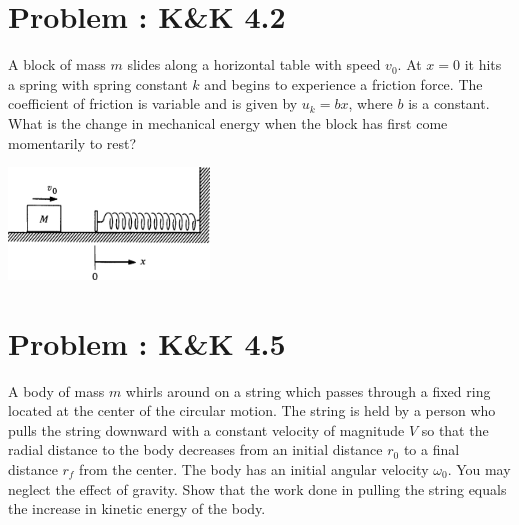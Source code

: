 \documentclass[problems]{esg8012pset}
\date{October 15}
\begin{document}
\section{Problem \thesection: K\&K 4.2}
  A block of mass $m$ slides along a horizontal table with speed $v_0$. At $x = 0$ it hits a spring with spring constant $k$ and begins to experience a friction force. The coefficient of friction is variable and is given by $u_k = bx$, where $b$ is a constant. What is the change in mechanical energy when the block has first come momentarily to rest?
  \begin{center}\includegraphics[width=0.4\textwidth]{ps06_1}\end{center}
\section{Problem \thesection: K\&K 4.5}
  A body of mass $m$ whirls around on a string which passes through a fixed ring located at the center of the circular motion. The string is held by a person who pulls the string downward with a constant velocity of magnitude $V$ so that the radial distance to the body decreases from an initial distance $r_0$ to a final distance $r_f$ from the center. The body has an initial angular velocity $\omega_0$. You may neglect the effect of gravity. Show that the work done in pulling the string equals the increase in kinetic energy of the body.
\end{document}
